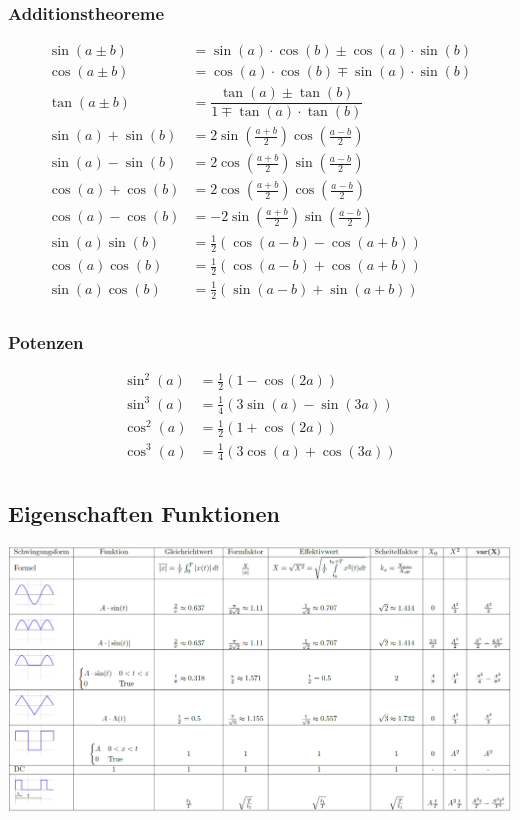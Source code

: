 \subsubsection{Additionstheoreme}
\begin{align*}
	\sin(a \pm b)&=\sin(a) \cdot \cos(b) \pm \cos(a) \cdot \sin(b)\\
	\cos(a \pm b)&=\cos(a) \cdot \cos(b) \mp \sin(a) \cdot \sin(b)\\	
	\tan(a \pm b)&=\dfrac{\tan(a) \pm \tan(b)}{1 \mp \tan(a) \cdot \tan(b)}\\
	\sin(a)+\sin(b) &= 2\sin\left(\frac{a + b}{2}\right)\cos\left(\frac{a - b}{2}\right)\\
	\sin(a)-\sin(b) &= 2\cos\left(\frac{a + b}{2}\right)\sin\left(\frac{a - b}{2}\right)\\
	\cos(a)+\cos(b) &= 2\cos\left(\frac{a + b}{2}\right)\cos\left(\frac{a - b}{2}\right)\\
	\cos(a)-\cos(b) &= -2\sin\left(\frac{a + b}{2}\right)\sin\left(\frac{a - b}{2}\right)\\
	\sin(a)\sin(b)&=\frac{1}{2}(\cos(a-b)-\cos(a+b))\\
	\cos(a)\cos(b)&=\frac{1}{2}(\cos(a-b)+\cos(a+b))\\
	\sin(a)\cos(b)&=\frac{1}{2}(\sin(a-b)+\sin(a+b))\\
\end{align*}

\subsubsection{Potenzen}
\begin{align*}
	\sin^2(a) &= \frac{1}{2}(1 - \cos(2a)) \\
	\sin^3(a) &= \frac{1}{4}(3\sin(a) - \sin(3a)) \\
	\cos^2(a) &= \frac{1}{2}(1 + \cos(2a)) \\
	\cos^3(a) &= \frac{1}{4}(3\cos(a) + \cos(3a)) \\
\end{align*}

\newpage

\begin{landscape}
	\section{Eigenschaften Funktionen}
	\begin{center}
		\includegraphics[width=\linewidth]{./Images/eigenschaften.png}
	\end{center}
\end{landscape}

